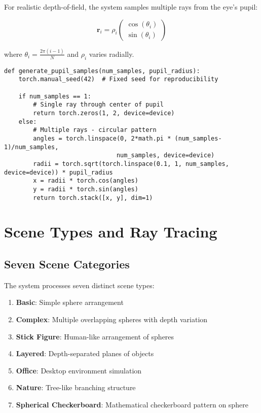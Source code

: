 \documentclass[12pt,a4paper]{article}
\begin{document}
For realistic depth-of-field, the system samples multiple rays from the eye's pupil:

\begin{equation}
\mathbf{r}_i = \rho_i \begin{pmatrix} \cos(\theta_i) \\ \sin(\theta_i) \end{pmatrix}
\end{equation}

where $\theta_i = \frac{2\pi(i-1)}{N}$ and $\rho_i$ varies radially.

\begin{lstlisting}[caption=Multi-Ray Pupil Sampling]
def generate_pupil_samples(num_samples, pupil_radius):
    torch.manual_seed(42)  # Fixed seed for reproducibility
    
    if num_samples == 1:
        # Single ray through center of pupil
        return torch.zeros(1, 2, device=device)
    else:
        # Multiple rays - circular pattern
        angles = torch.linspace(0, 2*math.pi * (num_samples-1)/num_samples, 
                               num_samples, device=device)
        radii = torch.sqrt(torch.linspace(0.1, 1, num_samples, device=device)) * pupil_radius
        x = radii * torch.cos(angles)
        y = radii * torch.sin(angles)
        return torch.stack([x, y], dim=1)
\end{lstlisting}

\section{Scene Types and Ray Tracing}

\subsection{Seven Scene Categories}

The system processes seven distinct scene types:

\begin{enumerate}
    \item \textbf{Basic}: Simple sphere arrangement
    \item \textbf{Complex}: Multiple overlapping spheres with depth variation
    \item \textbf{Stick Figure}: Human-like arrangement of spheres
    \item \textbf{Layered}: Depth-separated planes of objects  
    \item \textbf{Office}: Desktop environment simulation
    \item \textbf{Nature}: Tree-like branching structure
    \item \textbf{Spherical Checkerboard}: Mathematical checkerboard pattern on sphere
\end{enumerate}
\end{document}
